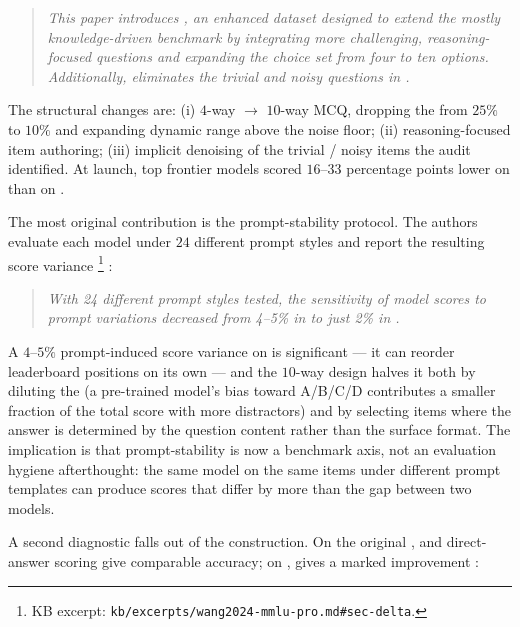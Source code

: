 \begin{quote}\itshape
This paper introduces , an enhanced dataset designed to extend
the mostly knowledge-driven  benchmark by integrating more
challenging, reasoning-focused questions and expanding the choice set
from four to ten options. Additionally,  eliminates the trivial
and noisy questions in .
\end{quote}

The structural changes are: (i) $4$-way $\to$ $10$-way MCQ, dropping
the  from $25\%$ to $10\%$ and expanding dynamic
range above the noise floor; (ii) reasoning-focused item authoring;
(iii) implicit denoising of the trivial / noisy items the
\citeauthor{mmlu-redux-2024} audit identified. At launch, top frontier
models scored $16$--$33$ percentage points lower on  than on
 \citep[\S{}sec-delta]{wang2024-mmlu-pro}.

The most original contribution is the prompt-stability protocol. The
authors evaluate each model under $24$ different prompt styles and
report the resulting score variance%
\footnote{KB excerpt: \nolinkurl{kb/excerpts/wang2024-mmlu-pro.md#sec-delta}.}
\citep[\S{}abstract]{wang2024-mmlu-pro}:

\begin{quote}\itshape
With 24 different prompt styles tested, the sensitivity of model
scores to prompt variations decreased from 4--5\% in  to just
2\% in .
\end{quote}

A $4$--$5\%$ prompt-induced score variance on  is significant ---
it can reorder leaderboard positions on its own --- and the $10$-way
design halves it both by diluting the  (a
pre-trained model's bias toward A/B/C/D contributes a smaller fraction
of the total score with more distractors) and by selecting items where
the answer is determined by the question content rather than the
surface format. The implication is that prompt-stability is now a
benchmark axis, not an evaluation hygiene afterthought: the same
model on the same items under different prompt templates can produce
scores that differ by more than the gap between two models.

\begin{sloppypar}
A second diagnostic falls out of the  construction. On the
original ,  and direct-answer scoring give
comparable accuracy; on ,  gives a marked improvement
\citep[\S{}sec-cot]{wang2024-mmlu-pro}:
\end{sloppypar}

